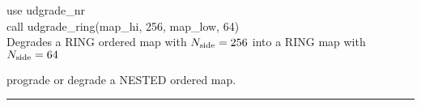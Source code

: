 \begin{example}
{
use udgrade\_nr \\
call udgrade\_ring(map\_hi, 256, map\_low, 64)  \\
}
{
Degrades a RING ordered map with ${N_{\rm side}}=256$ into a RING map with ${N_{\rm side}}=64$
}
\end{example}

\begin{related}
  \begin{sulist}{} %
  \item[\htmlref{udgrade\_nest}{sub:udgrade_nest}] prograde or degrade a NESTED
  ordered map.
  \end{sulist}
\end{related}

\rule{\hsize}{2mm}

\newpage
